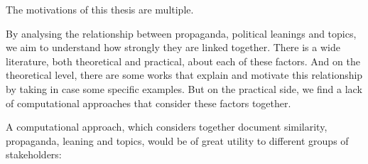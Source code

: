 


The motivations of this thesis are multiple.

By analysing the relationship between propaganda, political leanings and topics, we aim to understand how strongly they are linked together. There is a wide literature, both theoretical and practical, about each of these factors.
And on the theoretical level, there are some works that explain and motivate this relationship by taking in case some specific examples.
But on the practical side, we find a lack of computational approaches that consider these factors together.

A computational approach, which considers together document similarity, propaganda, leaning and topics, would be of great utility to different groups of stakeholders:

